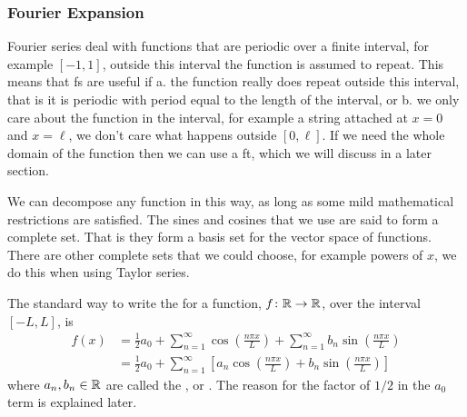 \documentclass[a4paper]{article}
\begin{document}
    \subsubsection{Fourier Expansion}
    Fourier series deal with functions that are periodic over a finite interval, for example \([-1, 1]\), outside this interval the function is assumed to repeat.
    This means that \acrshort{fs} are useful if a. the function really does repeat outside this interval, that is it is periodic with period equal to the length of the interval, or b. we only care about the function in the interval, for example a string attached at \(x = 0\) and \(x = \ell\), we don't care what happens outside \([0, \ell]\).
    If we need the whole domain of the function then we can use a \acrfull{ft}, which we will discuss in a later section.
    
    We can decompose any function in this way, as long as some mild mathematical restrictions are satisfied.
    The sines and cosines that we use are said to form a complete set.
    That is they form a basis set for the vector space of functions.
    There are other complete sets that we could choose, for example powers of \(x\), we do this when using Taylor series.
    
    The standard way to write the  for a function, \(f\colon\mathbb{R}\to\mathbb{R}\), over the interval \([-L, L]\), is
    \begin{align*}
        f(x) &= \frac{1}{2}a_0 + \sum_{n=1}^\infty\cos\left(\frac{n\pi x}{L}\right) + \sum_{n=1}^\infty b_n\sin\left(\frac{n\pi x}{L}\right)\\
        &= \frac{1}{2}a_0 + \sum_{n=1}^\infty\left[a_n\cos\left(\frac{n\pi x}{L}\right) + b_n\sin\left(\frac{n\pi x}{L}\right)\right]
    \end{align*}
    where \(a_n, b_n\in\mathbb{R}\) are called the , or .
    The reason for the factor of \(1/2\) in the \(a_0\) term is explained later.
    
\end{document}
